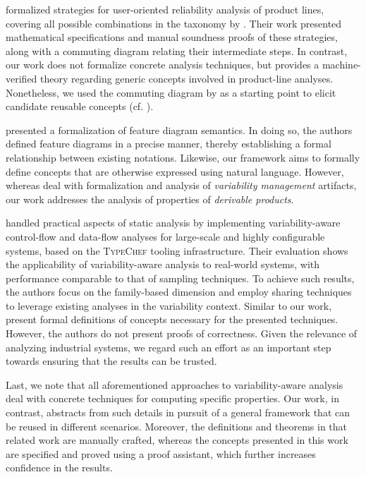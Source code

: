\citet{Castro2017} formalized strategies for user-oriented reliability analysis of
product lines, covering all possible combinations in the taxonomy by \citet{Thum2014}.
Their work presented mathematical specifications and manual soundness proofs of these
strategies, along with a commuting diagram relating their intermediate steps.
In contrast, our work does not formalize concrete analysis techniques, but provides
a machine-verified theory regarding generic concepts involved in product-line
analyses.
Nonetheless, we used the commuting diagram by \citet{Castro2017} as a starting point
to elicit candidate reusable concepts (cf. ).

\citet{generic-semantics-fm} presented a formalization of feature diagram semantics.
In doing so, the authors defined feature diagrams in a precise manner, thereby establishing a formal relationship between existing notations.
Likewise, our framework aims to formally define concepts that are otherwise expressed using natural language.
However, whereas \citet{generic-semantics-fm} deal with formalization and analysis of \emph{variability management} artifacts, our work addresses the analysis of properties of \emph{derivable products}.

\citet{StaticAnalysisInPractice} handled practical aspects of static analysis by implementing variability-aware control-flow and data-flow analyses for large-scale and highly configurable systems, based on the \textsc{TypeChef} tooling infrastructure.
Their evaluation shows the applicability of variability-aware analysis to real-world systems, with performance comparable to that of sampling techniques.
To achieve such results, the authors focus on the family-based dimension and employ sharing techniques to leverage existing analyses in the variability context.
Similar to our work, \citet{StaticAnalysisInPractice} present formal definitions of concepts necessary for the presented techniques.
However, the authors do not present proofs of correctness.
Given the relevance of analyzing industrial systems, we regard such an effort as an important step towards ensuring that the results can be trusted.

Last, we note that all aforementioned approaches to variability-aware analysis deal with concrete techniques for computing specific properties.
Our work, in contrast, abstracts from such details in pursuit of a general framework that can be reused in different scenarios.
Moreover, the definitions and theorems in that related work are manually crafted, whereas the concepts presented in this work are specified and proved using a proof assistant, which further increases confidence in the results.

